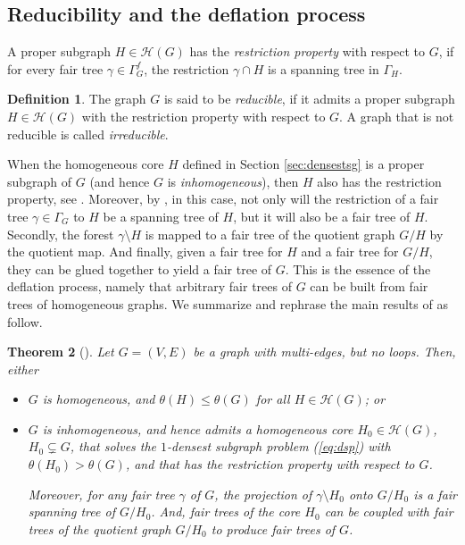 \documentclass[preprint,12pt]{elsarticle}
\newtheorem{theorem}{Theorem}[section]
\theoremstyle{definition}
\newtheorem{definition}[theorem]{Definition}
\theoremstyle{remark}
\numberwithin{equation}{section}
\newcommand{\cH}{\mathcal{H}}
\newcommand{\ga}{\gamma }
\newcommand{\Ga}{\Gamma }
\newcommand{\bi}{\begin{itemize}}
\newcommand{\ei}{\end{itemize}}
\begin{document}
\subsection{Reducibility and the deflation process}
A proper subgraph $H\in\cH(G)$ has the {\it restriction property} with respect to $G$, if for every fair tree $\ga\in\Ga_G^f$, the restriction $\ga\cap H$ is a spanning tree in $\Ga_H$.
\begin{definition}\label{def:irreducible}
The graph $G$ is said to be {\it reducible}, if it admits a proper subgraph $H\in\cH(G)$ with the restriction property with respect to $G$. A graph that is not reducible is called {\it irreducible}. 
\end{definition}
When the homogeneous core $H$ defined in Section \ref{sec:densestsg} is a proper subgraph of $G$ (and hence $G$ is {\it inhomogeneous}), then $H$ also has the restriction property, see \cite[Theorem 5.2]{achpcst}. Moreover, by \cite[Theorem 5.7]{achpcst}, in this case, not only will the restriction of a fair tree $\ga\in\Ga_G$ to $H$ be a spanning tree of $H$, but it will also be a fair tree of $H$. Secondly, the forest $\ga\setminus H$ is mapped to a fair tree of the quotient graph $G/H$ by the quotient map. And finally, given a fair tree for $H$ and a fair tree for $G/H$, they can be glued together to yield a fair tree of $G$.
This is the essence of the deflation process, namely that arbitrary fair trees of $G$ can be built from fair trees of homogeneous graphs.
We summarize and rephrase the main results of \cite{achpcst} as follow.
\begin{theorem}[\cite{achpcst}]\label{thm:feu-paper}
Let $G=(V,E)$ be a graph  with multi-edges, but no loops. Then, either 
\bi
\item[(i)] $G$ is homogeneous, and $\theta(H)\le\theta(G)$ for all $H\in\cH(G)$; or 
\item[(ii)] $G$ is inhomogeneous, and hence admits a homogeneous {\rm core} $H_0\in\cH(G)$, $H_0\subsetneq G$, that solves the $1$-densest subgraph problem (\ref{eq:dsp}) with $\theta(H_0)>\theta(G)$, and that  has the restriction property with respect to $G$. 

Moreover, for any fair tree $\ga$ of $G$, the projection of $\ga\setminus H_0$ onto $G/H_0$ is a fair spanning tree of $G/H_0$. And, fair trees of the core $H_0$ can be coupled with fair trees of the quotient graph $G/H_0$ to produce fair trees of $G$.
\ei
\end{theorem}
\end{document}

